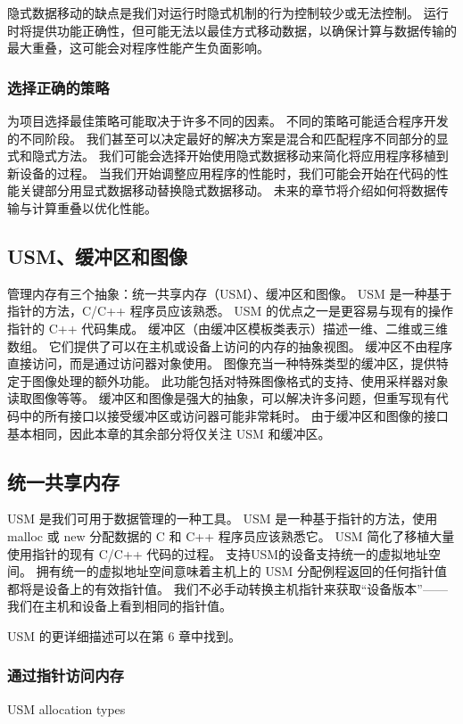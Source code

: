 隐式数据移动的缺点是我们对运行时隐式机制的行为控制较少或无法控制。 
运行时将提供功能正确性，但可能无法以最佳方式移动数据，以确保计算与数据传输的最大重叠，这可能会对程序性能产生负面影响。

\subsubsection{选择正确的策略}
为项目选择最佳策略可能取决于许多不同的因素。 不同的策略可能适合程序开发的不同阶段。 
我们甚至可以决定最好的解决方案是混合和匹配程序不同部分的显式和隐式方法。 
我们可能会选择开始使用隐式数据移动来简化将应用程序移植到新设备的过程。 
当我们开始调整应用程序的性能时，我们可能会开始在代码的性能关键部分用显式数据移动替换隐式数据移动。 
未来的章节将介绍如何将数据传输与计算重叠以优化性能。

\subsection{USM、缓冲区和图像}
管理内存有三个抽象：统一共享内存（USM）、缓冲区和图像。 USM 是一种基于指针的方法，C/C++ 程序员应该熟悉。 
USM 的优点之一是更容易与现有的操作指针的 C++ 代码集成。 缓冲区（由缓冲区模板类表示）描述一维、二维或三维数组。 
它们提供了可以在主机或设备上访问的内存的抽象视图。 缓冲区不由程序直接访问，而是通过访问器对象使用。 
图像充当一种特殊类型的缓冲区，提供特定于图像处理的额外功能。 
此功能包括对特殊图像格式的支持、使用采样器对象读取图像等等。 
缓冲区和图像是强大的抽象，可以解决许多问题，但重写现有代码中的所有接口以接受缓冲区或访问器可能非常耗时。 
由于缓冲区和图像的接口基本相同，因此本章的其余部分将仅关注 USM 和缓冲区。

\subsection{统一共享内存}
USM 是我们可用于数据管理的一种工具。 
USM 是一种基于指针的方法，使用 malloc 或 new 分配数据的 C 和 C++ 程序员应该熟悉它。 
USM 简化了移植大量使用指针的现有 C/C++ 代码的过程。 支持USM的设备支持统一的虚拟地址空间。 
拥有统一的虚拟地址空间意味着主机上的 USM 分配例程返回的任何指针值都将是设备上的有效指针值。 
我们不必手动转换主机指针来获取“设备版本”——我们在主机和设备上看到相同的指针值。

USM 的更详细描述可以在第 6 章中找到。

\subsubsection{通过指针访问内存}
{\color{red} USM allocation types}

